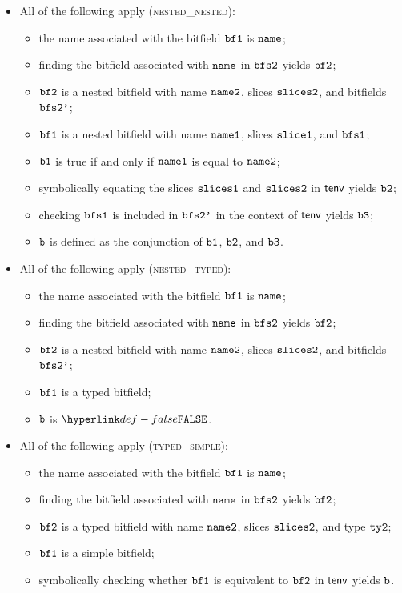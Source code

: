 \begin{itemize}
  \item All of the following apply (\textsc{nested\_nested}):
  \begin{itemize}
    \item the name associated with the bitfield $\texttt{bf1}$ is $\texttt{name}$;
    \item finding the bitfield associated with $\texttt{name}$ in $\texttt{bfs2}$ yields $\texttt{bf2}$;
    \item $\texttt{bf2}$ is a nested bitfield with name $\texttt{name2}$, slices $\texttt{slices2}$, and bitfields $\texttt{bfs2'}$;
    \item $\texttt{bf1}$ is a nested bitfield with name $\texttt{name1}$, slices $\texttt{slice1}$, and $\texttt{bfs1}$;
    \item $\texttt{b1}$ is true if and only if $\texttt{name1}$ is equal to $\texttt{name2}$;
    \item symbolically equating the slices $\texttt{slices1}$ and $\texttt{slices2}$ in $\textsf{tenv}$ yields $\texttt{b2}$;
    \item checking $\texttt{bfs1}$ is included in $\texttt{bfs2'}$ in the context of $\textsf{tenv}$ yields $\texttt{b3}$;
    \item $\texttt{b}$ is defined as the conjunction of $\texttt{b1}$, $\texttt{b2}$, and $\texttt{b3}$.
  \end{itemize}

  \item All of the following apply (\textsc{nested\_typed}):
  \begin{itemize}
    \item the name associated with the bitfield $\texttt{bf1}$ is $\texttt{name}$;
    \item finding the bitfield associated with $\texttt{name}$ in $\texttt{bfs2}$ yields $\texttt{bf2}$;
    \item $\texttt{bf2}$ is a nested bitfield with name $\texttt{name2}$, slices $\texttt{slices2}$, and bitfields $\texttt{bfs2'}$;
    \item $\texttt{bf1}$ is a typed bitfield;
    \item $\texttt{b}$ is $\False$.
  \end{itemize}

  \item All of the following apply (\textsc{typed\_simple}):
  \begin{itemize}
    \item the name associated with the bitfield $\texttt{bf1}$ is $\texttt{name}$;
    \item finding the bitfield associated with $\texttt{name}$ in $\texttt{bfs2}$ yields $\texttt{bf2}$;
    \item $\texttt{bf2}$ is a typed bitfield with name $\texttt{name2}$, slices $\texttt{slices2}$, and type $\texttt{ty2}$;
    \item $\texttt{bf1}$ is a simple bitfield;
    \item symbolically checking whether $\texttt{bf1}$ is equivalent to $\texttt{bf2}$ in $\textsf{tenv}$ yields $\texttt{b}$.
  \end{itemize}


\end{itemize}
